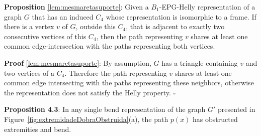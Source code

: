 \documentclass[9pt]{entcs}
\begin{document}
\begin{pro*} \textbf{Proposition} \ref{lem:mesmaretasuporte}:
Given a $B_1$-EPG-Helly representation of a graph $G$ that has an induced $C_4$ whose representation is isomorphic to a frame. If there is a vertex $v$ of $G$, outside this $C_4$, that is adjacent to exactly two consecutive vertices of this $C_4$, then the path representing $v$ shares at least one common edge-intersection with the paths representing both vertices.%
\end{pro*}

\begin{prove*} \textbf{Proof} \ref{lem:mesmaretasuporte}:
By assumption, $G$ has a triangle containing $v$ and two vertices of a $C_4$. Therefore the path representing $v$ shares at least one common edge intersecting with the paths representing these neighbors, otherwise the representation does not satisfy the Helly property.
$\square$ \end{prove*}


\begin{prop*}\textbf{Proposition 4.3}: %
In any single bend representation of the graph $G'$ presented in Figure~\ref{fig:extremidadeDobraObstruida}(a), the path $p(x)$ has obstructed extremities and bend.
\end{prop*}
\end{document}
